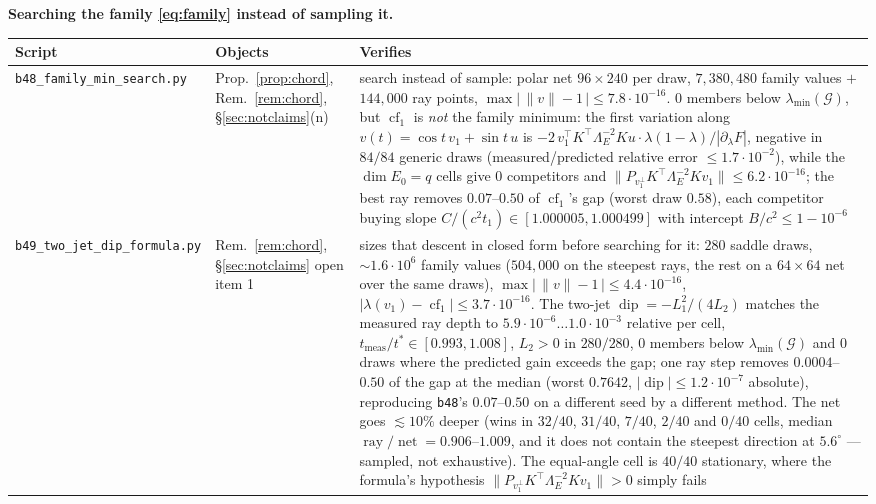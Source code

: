 \documentclass[11pt]{article}
\theoremstyle{remark}
\newcommand{\Gr}{\mathcal{G}}
\newcommand{\Le}{\Lambda_E}
\begin{document}
\noindent\textbf{Searching the family \eqref{eq:family} instead of sampling it.}
\begin{center}\footnotesize\begin{tabular}{@{}>{\raggedright\arraybackslash}p{5.1cm}%
>{\raggedright\arraybackslash}p{2.5cm}>{\raggedright\arraybackslash}p{5.8cm}@{}}
\toprule Script & Objects & Verifies\\
\midrule
\texttt{b48\_family\_min\_search.py} & Prop.~\ref{prop:chord}, Rem.~\ref{rem:chord},
\S\ref{sec:notclaims}(n) & search instead of sample: polar net $96\times240$ per draw,
$7{,}380{,}480$ family values $+$ $144{,}000$ ray points, $\max|\,\|v\|-1\,|\le7.8\cdot10^{-16}$.
$0$ members below $\lambda_{\min}(\Gr)$, but $\operatorname{cf}_1$ is \emph{not} the family minimum:
the first variation along $v(t)=\cos t\,v_1+\sin t\,u$ is
$-2\,v_1^{\top}K^{\top}\Le^{-2}Ku\cdot\lambda(1-\lambda)/|\partial_\lambda F|$, negative in $84/84$
generic draws (measured/predicted relative error $\le1.7\cdot10^{-2}$), while the $\dim E_0=q$ cells
give $0$ competitors and $\|P_{v_1^{\perp}}K^{\top}\Le^{-2}Kv_1\|\le6.2\cdot10^{-16}$; the best ray
removes $0.07$--$0.50$ of $\operatorname{cf}_1$'s gap (worst draw $0.58$), each competitor buying slope
$C/(c^{2}t_1)\in[1.000005,1.000499]$ with intercept $B/c^{2}\le1-10^{-6}$\\
\texttt{b49\_two\_jet\_dip\_formula.py} & Rem.~\ref{rem:chord},
\S\ref{sec:notclaims} open item 1 & sizes that descent in closed form before searching for it:
$280$ saddle draws, $\sim1.6\cdot10^{6}$ family values ($504{,}000$ on the steepest rays, the rest on a
$64\times64$ net over the same draws), $\max|\,\|v\|-1\,|\le4.4\cdot10^{-16}$,
$|\lambda(v_1)-\operatorname{cf}_1|\le3.7\cdot10^{-16}$. The two-jet
$\operatorname{dip}=-L_1^{2}/(4L_2)$ matches the measured ray depth to
$5.9\cdot10^{-6}\ldots1.0\cdot10^{-3}$ relative per cell, $t_{\mathrm{meas}}/t^{*}\in[0.993,1.008]$,
$L_2>0$ in $280/280$, $0$ members below $\lambda_{\min}(\Gr)$ and $0$ draws where the predicted gain
exceeds the gap; one ray step removes $0.0004$--$0.50$ of the gap at the median (worst $0.7642$,
$|\operatorname{dip}|\le1.2\cdot10^{-7}$ absolute), reproducing \texttt{b48}'s $0.07$--$0.50$ on a
different seed by a different method. The net goes $\lesssim10\%$ deeper (wins in $32/40$, $31/40$,
$7/40$, $2/40$ and $0/40$ cells, median $\operatorname{ray}/\operatorname{net}=0.906$--$1.009$, and it
does not contain the steepest direction at $5.6^{\circ}$ --- sampled, not exhaustive). The equal-angle
cell is $40/40$ stationary, where the formula's hypothesis $\|P_{v_1^{\perp}}K^{\top}\Le^{-2}Kv_1\|>0$
simply fails\\
\bottomrule
\end{tabular}\end{center}
\end{document}
